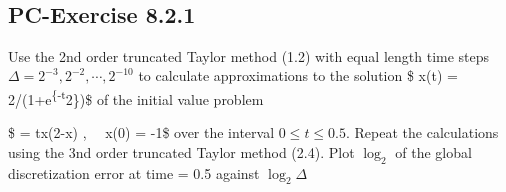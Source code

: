 \documentclass[a4paper,dvipdfmx]{jsarticle}
\newlength{\cellleftmargin}
\newlength{\smallerfontscale}
\def\smaller{\fontsize{\smallerfontscale}{\smallerfontscale}\selectfont}
\begin{document}
\par\vspace{1\smallerfontscale}%
    \begin{addmargin}[\cellleftmargin]{0em}%
    {\smaller%
    \vspace{-1\smallerfontscale}%
    
    \begin{center}
    \end{center}
    { \hspace*{\fill} \\}
    }%
    \end{addmargin}%
    \subsection{PC-Exercise 8.2.1}\label{pc-exercise-8.2.1}

Use the 2nd order truncated Taylor method (1.2) with equal length time
steps \(\Delta = 2^{-3},2^{-2},\cdots,2^{-10}\) to calculate
approximations to the solution \$ x(t) =
2/(1+e\textsuperscript{\{-t}2\})\$ of the initial value problem

\$  = tx(2-x) , ~~x(0) = -1\$ over the interval
\(0 \le t \le 0.5\). Repeat the calculations using the 3nd order
truncated Taylor method (2.4). Plot \(\log_2\) of the global
discretization error at time = 0.5 against \(\log_2 \Delta\)

\end{document}
